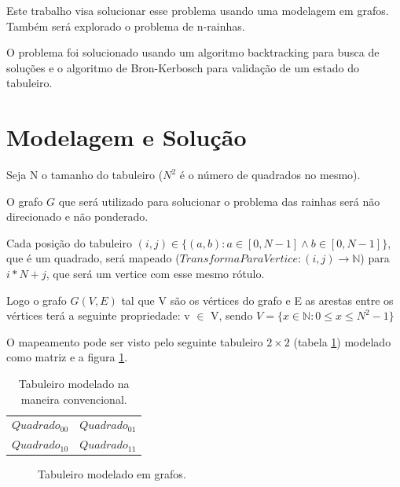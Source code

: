 \documentclass[11pt]{article}
\begin{document}
Este trabalho visa solucionar esse problema usando uma modelagem em grafos. Também será explorado o problema de n-rainhas.

O problema foi solucionado usando um algoritmo backtracking para busca de soluções e o algoritmo de Bron-Kerbosch para validação de um estado do tabuleiro.

\section{Modelagem e Solução}
\label{sec:org0780497}

Seja N o tamanho do tabuleiro (\(N^2\) é o número de quadrados no mesmo).

O grafo \(G\) que será utilizado para solucionar o problema das rainhas será não direcionado e não ponderado.

Cada posição do tabuleiro \((i,j) \in \{(a,b) : a \in [0,N-1] \land b \in [0,N-1] \}\), que é um quadrado, será mapeado (\(TransformaParaVertice: (i,j) \rightarrow \mathbb{N}\)) para \(i*N+j\), que será um vertice com esse mesmo rótulo.

Logo o grafo \(G(V,E)\) tal que V são os vértices do grafo e E as arestas entre os vértices terá a seguinte propriedade: v \(\in\) V, sendo \(V = \{x \in \mathbb{N} : 0 \leq x \leq N^2-1 \}\)

O mapeamento pode ser visto pelo seguinte tabuleiro \(2\times 2\) (tabela \ref{tab:tabuleiro}) modelado como matriz e a figura \ref{fig:tabgrafos}.

\begin{table}[htbp]
\centering
\begin{tabular}{ll}
\(Quadrado_{00}\) & \(Quadrado_{01}\)\\
\(Quadrado_{10}\) & \(Quadrado_{11}\)\\
\end{tabular}
\caption{\label{tab:tabuleiro}
Tabuleiro modelado na maneira convencional.}

\end{table}


\begin{figure}
\begin{center}
\end{center}
\caption{Tabuleiro modelado em grafos.}\label{fig:tabgrafos}
\end{figure}
\end{document}
